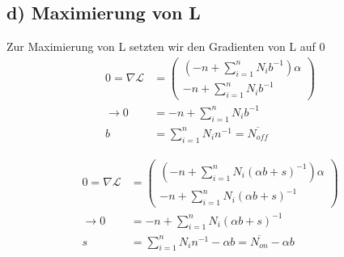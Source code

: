 \subsection*{d) Maximierung von L}
\label{sub:Maximierung von L}
Zur Maximierung von L setzten wir den Gradienten von L auf $0$
\begin{align}
    0=\nabla \mathcal{L}&=\left(\begin{matrix}
        \left(-n+\sum_{i=1}^n N_i b^{-1}\right)\alpha\\
        -n +\sum_{i=1}^n N_i b^{-1}
    \end{matrix}\right)\nonumber\\
    \rightarrow 0&=-n+\sum_{i=1}^n N_ib^{-1}\nonumber\\
                b&=\sum_{i=1}^n N_i n^{-1}=\overline{N_{off}}
\end{align}

\begin{align}
    0=\nabla \mathcal{L}&=\left(\begin{matrix}
        \left(-n+\sum_{i=1}^n N_i(\alpha b + s)^{-1}\right)\alpha\\
        -n +\sum_{i=1}^n N_i (\alpha b +s)^{-1}
    \end{matrix}\right)\nonumber\\
    \rightarrow 0&=-n+\sum_{i=1}^n N_i(\alpha b + s)^{-1}\nonumber\\
                s&=\sum_{i=1}^n N_i n^{-1}-\alpha b=\overline{N_{on}}-\alpha b
\end{align}